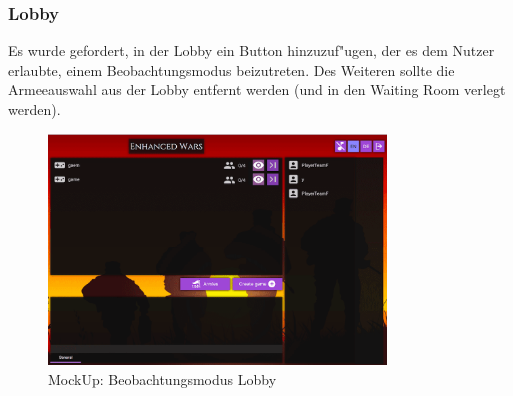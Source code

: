 \documentclass[12pt, titlepage]{scrartcl}
\begin{document}
	        \subsubsection{Lobby}
	           Es wurde gefordert, in der Lobby ein Button hinzuzuf"ugen, der es dem Nutzer erlaubte, einem Beobachtungsmodus beizutreten. Des Weiteren sollte die Armeeauswahl aus der Lobby entfernt werden (und in den Waiting Room verlegt werden). \\
	            \begin{figure}[H] 
    				\centering
    				\includegraphics[width=0.8\textwidth]{images/mockUps/LobbyWatchMode.png}
    				\caption{MockUp: Beobachtungsmodus Lobby}
    				\label{Watch_Mode}
			    \end{figure}
\end{document}
